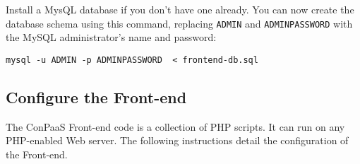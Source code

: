 \documentclass[10pt]{article}
\newenvironment{framedbox}[1]%
{\begin{framed}
 \begingroup
 \fontsize{#1}{#1}\selectfont
}
{
 \endgroup
 \end{framed}
}
\begin{document}
Install a MysQL database if you don't have one already. You can now
create the database schema using this command, replacing \verb+ADMIN+
and \verb+ADMINPASSWORD+ with the MySQL administrator's name and
password:

\begin{framedbox}{8pt}\begin{verbatim}
mysql -u ADMIN -p ADMINPASSWORD  < frontend-db.sql
\end{verbatim}\end{framedbox}



\subsection{Configure the Front-end}

The ConPaaS Front-end code is a collection of PHP scripts. It can run
on any PHP-enabled Web server. The following instructions detail the
configuration of the Front-end.
\end{document}
